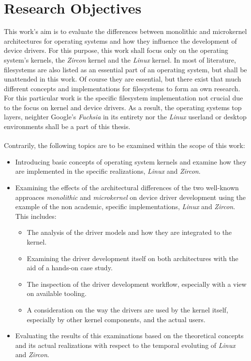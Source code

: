 \section{Research Objectives}\label{sec:research-objectives}
This work's aim is to evaluate the differences between monolithic and microkernel architectures for operating systems and how they influence the development of device drivers.
For this purpose, this work shall focus only on the operating system's kernels, the \textit{Zircon} kernel and the \textit{Linux} kernel.
In most of literature, filesystems are also listed as an essential part of an operating system, but shall be unattended in this work.
Of course they are essential, but there exist that much different concepts and implementations for filesystems to form an own research.
For this particular work is the specific filesystem implementation not crucial due to the focus on kernel and device drivers.
As a result, the operating systems top layers, neighter Google's \textit{Fuchsia} in its entirety nor the \textit{Linux} userland or desktop environments shall be a part of this thesis.\\
\\
Contrarily, the following topics are to be examined within the scope of this work:
\begin{itemize}
    \item Introducing basic concepts of operating system kernels and examine how they are implemented in the specific realizations, \textit{Linux} and \textit{Zircon}.
    \item Examining the effects of the architectural differences of the two well-known approaces \textit{monolithic} and \textit{microkernel} on device driver development using the example of the non academic, specific implementations, \textit{Linux} and \textit{Zircon}. This includes:  
        \begin{itemize}
            \item The analysis of the driver models and how they are integrated to the kernel.
            \item Examining the driver development itself on both architectures with the aid of a hands-on case study.
            \item The inspection of the driver development workflow, especially with a view on available tooling. 
            \item A consideration on the way the drivers are used by the kernel itself, especially by other kernel components, and the actual users.
        \end{itemize}
    \item Evaluating the results of this examinations based on the theoretical concepts and its actual realizations with respect to the temporal evoluting of \textit{Linux} and \textit{Zircon}.
\end{itemize}

